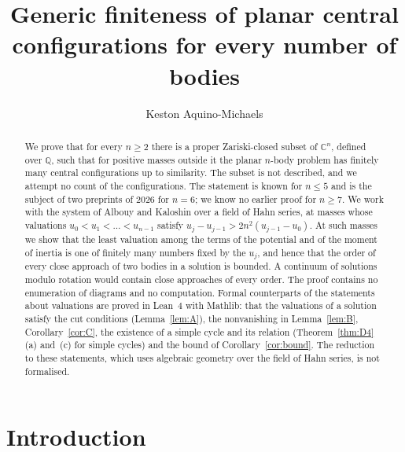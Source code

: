 \documentclass[11pt]{amsart}
\theoremstyle{definition}
\theoremstyle{remark}
\numberwithin{equation}{section}
\newcommand{\QQ}{\mathbb{Q}}
\newcommand{\CC}{\mathbb{C}}
\begin{document}
\title[Generic finiteness of planar central configurations]{Generic finiteness of planar central configurations for every number of bodies}

\author{Keston Aquino-Michaels}
\address{Independent researcher}

\begin{abstract}
We prove that for every $n \ge 2$ there is a proper Zariski-closed subset of $\CC^n$, defined over
$\QQ$, such that for positive masses outside it the planar $n$-body problem has finitely many central
configurations up to similarity. The subset is not described, and we attempt no count of the
configurations. The statement is known for $n \le 5$ and is the subject of two preprints of 2026 for
$n = 6$; we know no earlier proof for $n \ge 7$. We work with the system of Albouy and Kaloshin over a
field of Hahn series, at masses whose valuations $u_0 < u_1 < \dots < u_{n-1}$ satisfy
$u_j - u_{j-1} > 2n^2 (u_{j-1} - u_0)$. At such masses we show that the least valuation among the terms
of the potential and of the moment of inertia is one of finitely many numbers fixed by the $u_j$, and
hence that the order of every close approach of two bodies in a solution is bounded. A continuum of
solutions modulo rotation would contain close approaches of every order. The proof contains no
enumeration of diagrams and no computation. Formal counterparts of the statements about valuations are
proved in Lean~4 with Mathlib: that the valuations of a solution satisfy the cut conditions
(Lemma~\ref{lem:A}), the nonvanishing in Lemma~\ref{lem:B}, Corollary~\ref{cor:C}, the existence of a
simple cycle and its relation (Theorem~\ref{thm:D4}(a) and~(c) for simple cycles) and the bound of
Corollary~\ref{cor:bound}. The reduction to these statements, which uses algebraic geometry over the
field of Hahn series, is not formalised.
\end{abstract}

\maketitle

\section{Introduction}\label{sec:intro}
\end{document}
